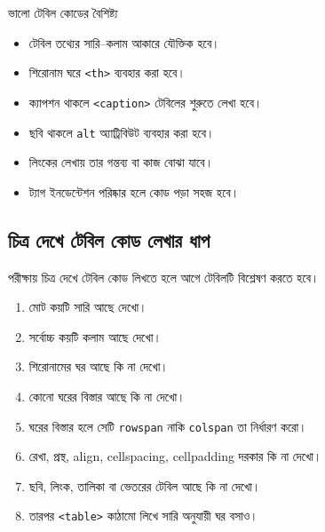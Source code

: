 \begin{boardbox}{ভালো টেবিল কোডের বৈশিষ্ট্য}
\par\noindent
\begin{minipage}[t]{.48\linewidth}\vspace{0pt}
\begin{itemize}
\item টেবিল তথ্যের সারি–কলাম আকারে যৌক্তিক হবে।
\item শিরোনাম ঘরে \texttt{<th>} ব্যবহার করা হবে।
\item ক্যাপশন থাকলে \texttt{<caption>} টেবিলের শুরুতে লেখা হবে।
\end{itemize}
\end{minipage}\hfill
\begin{minipage}[t]{.48\linewidth}\vspace{0pt}
\begin{itemize}
\item ছবি থাকলে \texttt{alt} অ্যাট্রিবিউট ব্যবহার করা হবে।
\item লিংকের লেখায় তার গন্তব্য বা কাজ বোঝা যাবে।
\item ট্যাগ ইনডেন্টেশন পরিষ্কার হলে কোড পড়া সহজ হবে।
\end{itemize}
\end{minipage}\par

\end{boardbox}

\subsection{চিত্র দেখে টেবিল কোড লেখার ধাপ}

পরীক্ষায় চিত্র দেখে টেবিল কোড লিখতে হলে আগে টেবিলটি বিশ্লেষণ করতে হবে।

\begin{enumerate}
\item মোট কয়টি সারি আছে দেখো।
\item সর্বোচ্চ কয়টি কলাম আছে দেখো।
\item শিরোনামের ঘর আছে কি না দেখো।
\item কোনো ঘরের বিস্তার আছে কি না দেখো।
\item ঘরের বিস্তার হলে সেটি \texttt{rowspan} নাকি \texttt{colspan} তা নির্ধারণ করো।
\item রেখা, প্রস্থ, align, cellspacing, cellpadding দরকার কি না দেখো।
\item ছবি, লিংক, তালিকা বা ভেতরের টেবিল আছে কি না দেখো।
\item তারপর \texttt{<table>} কাঠামো লিখে সারি অনুযায়ী ঘর বসাও।
\end{enumerate}

